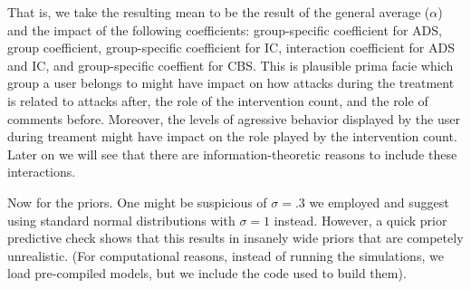\documentclass[10pt,dvipsnames,enabledeprecatedfontcommands]{scrartcl}
\begin{document}
That is, we take the resulting mean to be the result of the general
average (\(\alpha\)) and the impact of the following coefficients:
group-specific coefficient for \textsf{ADS}, group coefficient,
group-specific coefficient for \textsf{IC}, interaction coefficient for
\textsf{ADS} and \textsf{IC}, and group-specific coeffient for
\textsf{CBS}. This is plausible prima facie which group a user belongs
to might have impact on how attacks during the treatment is related to
attacks after, the role of the intervention count, and the role of
comments before. Moreover, the levels of agressive behavior displayed by
the user during treament might have impact on the role played by the
intervention count. Later on we will see that there are
information-theoretic reasons to include these interactions.

Now for the priors. One might be suspicious of \(\sigma =.3\) we
employed and suggest using standard normal distributions with
\(\sigma = 1\) instead. However, a quick prior predictive check shows
that this results in insanely wide priors that are competely
unrealistic. (For computational reasons, instead of running the
simulations, we load pre-compiled models, but we include the code used
to build them).

\vspace{1mm} \footnotesize
\end{document}
